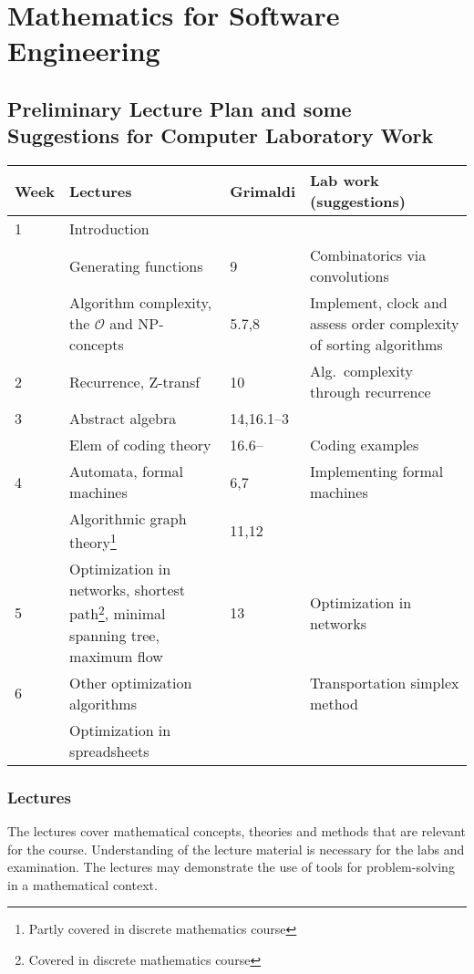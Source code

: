 \documentclass[10pt]{article}
\begin{document}
\section*{Mathematics for Software Engineering} 
\subsection*{Preliminary Lecture Plan and some\\
  Suggestions for Computer Laboratory Work}

\vspace{3ex}
\savenotes
\begin{tabular}{|p{}|p{}|p{}|
    p{}|}
  \hline
  Week&Lectures&Grimaldi&Lab work (suggestions)\\
  \hline %
  1 & Introduction & &
  \\
  & Generating functions %
  & 9 & Combinatorics via convolutions
  \\
  & Algorithm complexity, the $\mathcal{O}$ and NP-concepts & 5.7,8 &
  Implement, clock and assess order complexity of sorting algorithms
  \\\hline %
  2 & Recurrence, Z-transf & 10 & Alg.~complexity through recurrence
  \\
  \hline
  3&Abstract algebra&14,16.1--3&\\
  &Elem of coding theory&16.6--& Coding examples \\
  \hline
  4&Automata, formal machines&6,7&Implementing formal machines\\
  &Algorithmic graph theory\footnote{Partly covered in discrete
    mathematics course}&11,12&\\
  \hline
  5&Optimization in networks, shortest path\footnote{Covered in
    discrete mathematics course}, minimal spanning tree\footnotemark[2],
  maximum flow&13&Optimization in networks\\
  \hline
  6&Other optimization algorithms&
  &Transportation simplex method\\
  &Optimization in spreadsheets&&\\
  \hline
\end{tabular}
\spewnotes
\vspace{3ex}

\subsubsection*{Lectures}
The lectures cover mathematical concepts, theories and methods that
are relevant for the course. Understanding of the lecture material is
necessary for the labs and examination. The lectures may demonstrate
the use of tools for problem-solving in a mathematical context.
\end{document}
